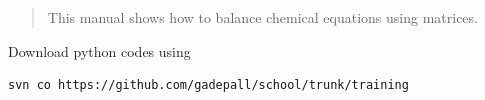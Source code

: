 \documentclass[journal,12pt,twocolumn]{IEEEtran}
\begin{document}
%

\begin{abstract}
This manual shows how to balance chemical equations using matrices.
\end{abstract}
Download python codes using 
\begin{lstlisting}
svn co https://github.com/gadepall/school/trunk/training
\end{lstlisting}

\end{document}
